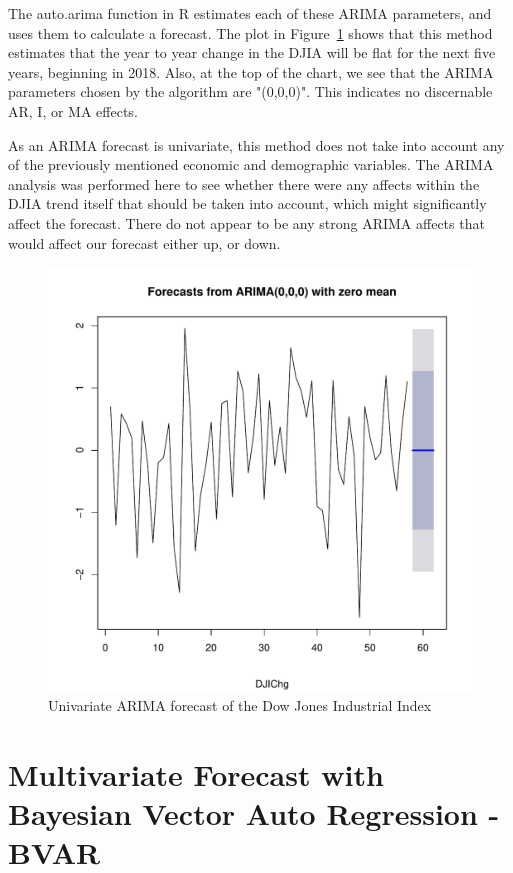 \documentclass[12pt]{article}         %
\begin{document}
The auto.arima function in R estimates each of these ARIMA parameters, and uses them to calculate a forecast.  The plot in Figure~\ref{fig:ArimaDJI} shows that this method estimates that the year to year change in the DJIA will be flat for the next five years, beginning in 2018.  Also, at the top of the chart, we see that the ARIMA parameters chosen by the algorithm are "(0,0,0)".  This indicates no discernable AR, I, or MA effects. 

As an ARIMA forecast is univariate, this method does not take into account any of the previously mentioned economic and demographic variables.  The ARIMA analysis was performed here to see whether there were any affects within the DJIA trend itself that should be taken into account, which might significantly affect the forecast.  There do not appear to be any strong ARIMA affects that would affect our forecast either up, or down.

\begin{figure}[h!]
\begin{center}
\includegraphics[width=\linewidth]{plots/DJIChg_arima.pdf}
\caption{Univariate ARIMA forecast of the Dow Jones Industrial Index}
\label{fig:ArimaDJI}
\end{center}
\end{figure}


\section{Multivariate Forecast with Bayesian Vector Auto Regression - BVAR}
\end{document}
